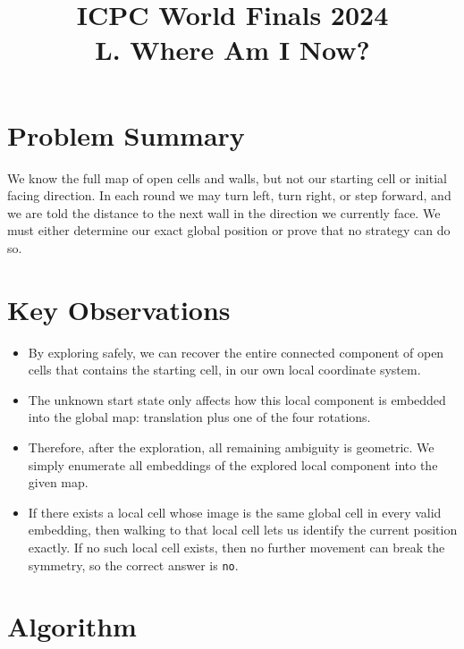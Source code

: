 \documentclass[11pt]{article}
\title{ICPC World Finals 2024\\L. Where Am I Now?}
\author{}
\date{}
\begin{document}
\maketitle

\section*{Problem Summary}

We know the full map of open cells and walls, but not our starting cell or initial facing direction. In each round we may turn left, turn right, or step forward, and we are told the distance to the next wall in the direction we currently face. We must either determine our exact global position or prove that no strategy can do so.

\section*{Key Observations}

\begin{itemize}[leftmargin=*]
    \item By exploring safely, we can recover the entire connected component of open cells that contains the starting cell, in our own local coordinate system.
    \item The unknown start state only affects how this local component is embedded into the global map: translation plus one of the four rotations.
    \item Therefore, after the exploration, all remaining ambiguity is geometric. We simply enumerate all embeddings of the explored local component into the given map.
    \item If there exists a local cell whose image is the same global cell in every valid embedding, then walking to that local cell lets us identify the current position exactly. If no such local cell exists, then no further movement can break the symmetry, so the correct answer is \texttt{no}.
\end{itemize}

\section*{Algorithm}
\end{document}

